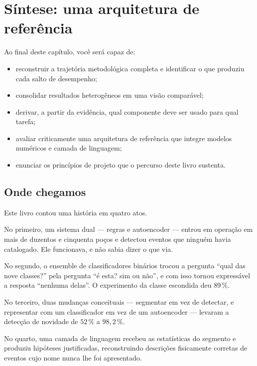 \chapter{Síntese: uma arquitetura de referência}
\label{cap:sintese}

\begin{objetivos}
Ao final deste capítulo, você será capaz de:
\begin{itemize}[leftmargin=*,itemsep=0.2em]
  \item reconstruir a trajetória metodológica completa e identificar o que produziu cada
        salto de desempenho;
  \item consolidar resultados heterogêneos em uma visão comparável;
  \item derivar, a partir da evidência, qual componente deve ser usado para qual tarefa;
  \item avaliar criticamente uma arquitetura de referência que integre modelos numéricos
        e camada de linguagem;
  \item enunciar os princípios de projeto que o percurso deste livro sustenta.
\end{itemize}
\end{objetivos}

\section{Onde chegamos}

Este livro contou uma história em quatro atos.

No primeiro, um sistema dual --- regras e autoencoder --- entrou em operação em mais de
duzentos e cinquenta poços e detectou eventos que ninguém havia catalogado. Ele
funcionava, e não sabia dizer o que via.

No segundo, o ensemble de classificadores binários trocou a pergunta ``qual das nove
classes?'' pela pergunta ``é esta? sim ou não'', e com isso tornou expressável a resposta
``nenhuma delas''. O experimento da classe escondida deu $89\,\%$.

No terceiro, duas mudanças conceituais --- segmentar em vez de detectar, e representar
com um classificador em vez de um autoencoder --- levaram a detecção de novidade de
$52\,\%$ a $98{,}2\,\%$.

No quarto, uma camada de linguagem recebeu as estatísticas do segmento e produziu
hipóteses justificadas, reconstruindo descrições fisicamente corretas de eventos cujo
nome nunca lhe foi apresentado.

